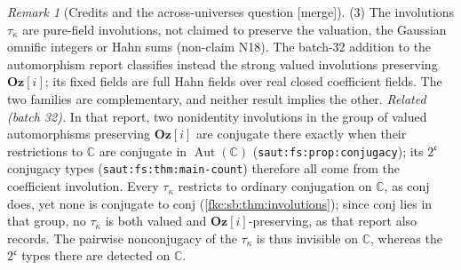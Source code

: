 \documentclass[11pt,letterpaper]{article}
\numberwithin{equation}{section}
\theoremstyle{definition}
\theoremstyle{remark}
\newtheorem{remark}[theorem]{Remark}
\newcommand{\C}{\mathbb C}
\newcommand{\mergetag}{\textup{\textsf{\small[merge]}}}%
\newcommand{\Oz}{\mathbf{Oz}}
\newcommand{\conj}{\mathrm{conj}}
\newcommand{\lbl}[1]{\nolinkurl{#1}}%
\begin{document}
\begin{remark}[Credits and the across-universes question \mergetag]
(3) The involutions $\tau_\kappa$ are pure-field involutions, not claimed to preserve the valuation, the Gaussian omnific integers or Hahn sums (non-claim N18). The batch-32 addition to the automorphism report classifies instead the strong valued involutions preserving $\Oz[i]$; its fixed fields are full Hahn fields over real closed coefficient fields. The two families are complementary, and neither result implies the other. \emph{Related (batch 32).} In that report, two nonidentity involutions in the group of valued automorphisms preserving $\Oz[i]$ are conjugate there exactly when their restrictions to $\C$ are conjugate in $\operatorname{Aut}(\C)$ (\lbl{saut:fs:prop:conjugacy}); its $2^{\mathfrak c}$ conjugacy types (\lbl{saut:fs:thm:main-count}) therefore all come from the coefficient involution. Every $\tau_\kappa$ restricts to ordinary conjugation on $\C$, as $\conj$ does, yet none is conjugate to $\conj$ (\cref{fkc:sb:thm:involutions}); since $\conj$ lies in that group, no $\tau_\kappa$ is both valued and $\Oz[i]$-preserving, as that report also records. The pairwise nonconjugacy of the $\tau_\kappa$ is thus invisible on $\C$, whereas the $2^{\mathfrak c}$ types there are detected on $\C$.
\end{remark}
\end{document}
